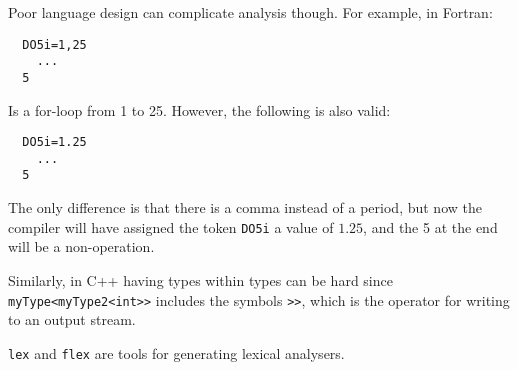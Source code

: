 Poor language design can complicate analysis though. For example, in Fortran:

\begin{verbatim}
  DO5i=1,25
    ...
  5
\end{verbatim}

Is a for-loop from 1 to 25. However, the following is also valid:

\begin{verbatim}
  DO5i=1.25
    ...
  5
\end{verbatim}


The only difference is that there is a comma instead of a period, but now the
compiler will have assigned the token \texttt{DO5i} a value of $1.25$, and the 5
at the end will be a non-operation.

Similarly, in C++ having types within types can be hard since
\texttt{myType<myType2<int>>} includes the symbols \texttt{>>}, which is the
operator for writing to an output stream.

\texttt{lex} and \texttt{flex} are tools for generating lexical analysers.